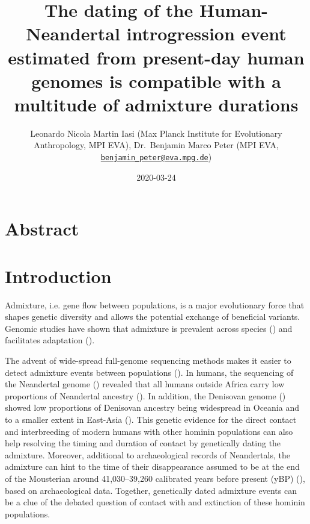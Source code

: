 \documentclass[]{article}
\title{The dating of the Human-Neandertal introgression event estimated from present-day human genomes is compatible with a multitude of admixture durations}
\author{Leonardo Nicola Martin Iasi (Max Planck Institute for Evolutionary
Anthropology, MPI EVA), Dr.~Benjamin Marco Peter (MPI EVA,
\href{mailto:benjamin_peter@eva.mpg.de}{\nolinkurl{benjamin\_peter@eva.mpg.de}})}
\date{2020-03-24}
\begin{document}
\maketitle

\section{Abstract}\label{abstract}

\section{Introduction}\label{introduction}

Admixture, i.e. gene flow between populations, is a major evolutionary force that shapes genetic diversity and allows the potential exchange of beneficial variants. Genomic studies have shown that admixture is prevalent across species (\cite{Salazar_Hybrid_speciation_2010, rieseberg_hybridization_2007,kronforst_multilocus_2006,kolbe_multiple_2007}) and facilitates adaptation (\cite{harrison_hybridization_2014,hedrick_adaptive_2013, shaw_genes_2011,payseur_using_2010}).

The advent of wide-spread full-genome sequencing methods makes it easier to detect admixture events
between populations (\cite{sousa_understanding_2013}). In humans, the sequencing of
the Neandertal genome (\cite{green_draft_2010}) revealed that all humans outside Africa carry low proportions of Neandertal ancestry
(\cite{green_draft_2010,prufer_complete_2013,vernot_resurrecting_2014,fu_early_2015,fu_genome_2014,sankararaman_genomic_2014,prufer_high-coverage_2017}). In addition, the  Denisovan genome (\cite{reich_genetic_2010})
showed low proportions of Denisovan ancestry being widespread in Oceania and to a smaller extent in East-Asia
(\cite{reich_genetic_2010,meyer_high-coverage_2012,sankararaman_combined_2016,vernot_excavating_2016,malaspinas_genomic_2016}).
This genetic evidence for the direct contact and interbreeding of modern humans with other hominin populations can also help resolving the timing and duration of contact by genetically dating the admixture.
Moreover, additional to archaeological records of Neandertals, the admixture can hint to the time of their disappearance assumed to be at the end of the Mousterian around 41,030–39,260 calibrated years before present (yBP) (\cite{higham_timing_2014}), based on archaeological data. 
Together, genetically dated admixture events can be a clue of the debated question of contact with and extinction of these hominin populations.
\end{document}
